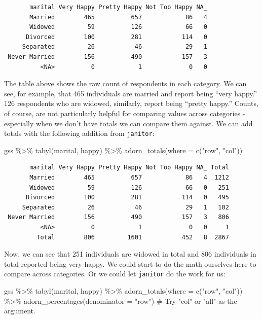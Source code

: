 \documentclass[
  letterpaper,
]{book}
\newenvironment{Shaded}{\begin{snugshade}}{\end{snugshade}}
\newcommand{\AttributeTok}[1]{\textcolor[rgb]{0.40,0.45,0.13}{#1}}
\newcommand{\CommentTok}[1]{\textcolor[rgb]{0.37,0.37,0.37}{#1}}
\newcommand{\FunctionTok}[1]{\textcolor[rgb]{0.28,0.35,0.67}{#1}}
\newcommand{\NormalTok}[1]{\textcolor[rgb]{0.00,0.23,0.31}{#1}}
\newcommand{\SpecialCharTok}[1]{\textcolor[rgb]{0.37,0.37,0.37}{#1}}
\newcommand{\StringTok}[1]{\textcolor[rgb]{0.13,0.47,0.30}{#1}}
\begin{document}
\begin{verbatim}
       marital Very Happy Pretty Happy Not Too Happy NA_
       Married        465          657            86   4
       Widowed         59          126            66   0
      Divorced        100          281           114   0
     Separated         26           46            29   1
 Never Married        156          490           157   3
          <NA>          0            1             0   0
\end{verbatim}

The table above shows the raw count of respondents in each category. We
can see, for example, that 465 individuals are married and report being
``very happy.'' 126 respondents who are widowed, similarly, report being
``pretty happy.'' Counts, of course, are not particularly helpful for
comparing values across categories - especially when we don't have
totals we can compare them against. We can add totals with the following
addition from \texttt{janitor}:

\begin{Shaded}
\begin{Highlighting}[]
\NormalTok{gss }\SpecialCharTok{\%\textgreater{}\%}
  \FunctionTok{tabyl}\NormalTok{(marital, happy) }\SpecialCharTok{\%\textgreater{}\%}
  \FunctionTok{adorn\_totals}\NormalTok{(}\AttributeTok{where =} \FunctionTok{c}\NormalTok{(}\StringTok{"row"}\NormalTok{, }\StringTok{"col"}\NormalTok{))}
\end{Highlighting}
\end{Shaded}

\begin{verbatim}
       marital Very Happy Pretty Happy Not Too Happy NA_ Total
       Married        465          657            86   4  1212
       Widowed         59          126            66   0   251
      Divorced        100          281           114   0   495
     Separated         26           46            29   1   102
 Never Married        156          490           157   3   806
          <NA>          0            1             0   0     1
         Total        806         1601           452   8  2867
\end{verbatim}

Now, we can see that 251 individuals are widowed in total and 806
individuals in total reported being very happy. We could start to do the
math ourselves here to compare across categories. Or we could let
\texttt{janitor} do the work for us:

\begin{Shaded}
\begin{Highlighting}[]
\NormalTok{gss }\SpecialCharTok{\%\textgreater{}\%}
  \FunctionTok{tabyl}\NormalTok{(marital, happy) }\SpecialCharTok{\%\textgreater{}\%}
  \FunctionTok{adorn\_totals}\NormalTok{(}\AttributeTok{where =} \FunctionTok{c}\NormalTok{(}\StringTok{"row"}\NormalTok{, }\StringTok{"col"}\NormalTok{)) }\SpecialCharTok{\%\textgreater{}\%}
  \FunctionTok{adorn\_percentages}\NormalTok{(}\AttributeTok{denominator =} \StringTok{"row"}\NormalTok{)   }\CommentTok{\# Try "col" or "all" as the argument.}
\end{Highlighting}
\end{Shaded}
\end{document}
